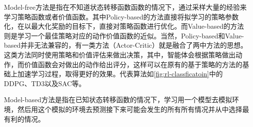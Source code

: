 Model-free方法是指在不知道状态转移函数函数的情况下，通过采样大量的经验来学习策略函数或者价值函数。其中Policy-based的方法直接将拟学习的策略参数化，在以最大化奖励的目标下，直接对策略函数进行优化。而Value-based的方法则是学习一个最佳策略对应的动作价值函数的近似。当然，Policy-based和Value-based并非无法兼容的，有一类方法（Actor-Critic）就是融合了两中方法的思想。
这类方法同时使用策略和价值评估来做出决策，其中，智能体会根据策略做出动作，而价值函数会对做出的动作给出评分，这样可以在原有的基于策略的方法的基础上加速学习过程，取得更好的效果。代表算法如\autoref{fig:rl-classficatoin}中的DDPG\cite{lillicrap2015continuous}、TD3\cite{fujimoto2018addressing}以及SAC\cite{haarnoja2018soft}等。

Model-based方法是指在已知状态转移函数的情况下，学习用一个模型去模拟环境，然后用这个模拟的环境去预测接下来可能会发生的所有所有情况并从中选择最有利的情况。




